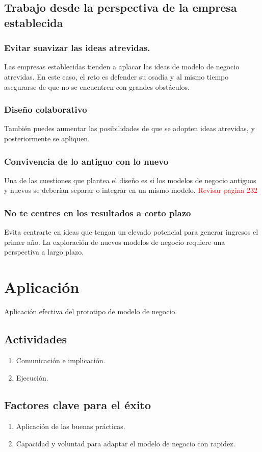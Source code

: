\documentclass[11pt]{book}
\begin{document}
\subsection{Trabajo desde la perspectiva de la empresa establecida}
\subsubsection{Evitar suavizar las ideas atrevidas.}
Las empresas establecidas tienden a aplacar las ideas de modelo de negocio atrevidas. En este caso, el reto es defender su osadía y al mismo tiempo asegurarse de que no se encuentren con grandes obstáculos.
\subsubsection{Diseño colaborativo}
También puedes aumentar las posibilidades de que se adopten ideas atrevidas, y posteriormente se apliquen.
\subsubsection{Convivencia de lo antiguo con lo nuevo}
Una de las cuestiones que plantea el diseño es si los modelos de negocio antiguos y nuevos se deberían separar o integrar en un mismo modelo. \textcolor{red}{Revisar pagina 232}
\subsubsection{No te centres en los resultados a corto plazo}
Evita centrarte en ideas que tengan un elevado potencial para generar ingresos el primer año.
La exploración de nuevos modelos de negocio requiere una perspectiva a largo plazo.
\section{Aplicación}
Aplicación efectiva del prototipo de modelo de negocio.
\subsection{Actividades}
\begin{enumerate}
\item Comunicación e implicación.
\item Ejecución.
\end{enumerate}
\subsection{Factores clave para el éxito}
\begin{enumerate}
\item Aplicación de las buenas prácticas.
\item Capacidad y voluntad para adaptar el modelo de negocio con rapidez.
\end{enumerate}
\end{document}
